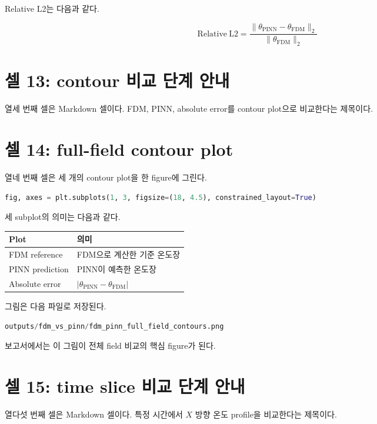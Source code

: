 \documentclass[11pt]{article}
\begin{document}
Relative L2는 다음과 같다.

\[
\mathrm{Relative\ L2}
=
\frac{\|\theta_{\mathrm{PINN}}-\theta_{\mathrm{FDM}}\|_2}
{\|\theta_{\mathrm{FDM}}\|_2}
\]

\section{셀 13: contour 비교 단계 안내}

열세 번째 셀은 Markdown 셀이다.
FDM, PINN, absolute error를 contour plot으로 비교한다는 제목이다.

\section{셀 14: full-field contour plot}

열네 번째 셀은 세 개의 contour plot을 한 figure에 그린다.

\begin{lstlisting}[language=Python]
fig, axes = plt.subplots(1, 3, figsize=(18, 4.5), constrained_layout=True)
\end{lstlisting}

세 subplot의 의미는 다음과 같다.

\begin{center}
\begin{tabular}{ll}
\toprule
Plot & 의미 \\
\midrule
FDM reference & FDM으로 계산한 기준 온도장 \\
PINN prediction & PINN이 예측한 온도장 \\
Absolute error & \(|\theta_{\mathrm{PINN}}-\theta_{\mathrm{FDM}}|\) \\
\bottomrule
\end{tabular}
\end{center}

그림은 다음 파일로 저장된다.

\begin{lstlisting}[language=Python]
outputs/fdm_vs_pinn/fdm_pinn_full_field_contours.png
\end{lstlisting}

보고서에서는 이 그림이 전체 field 비교의 핵심 figure가 된다.

\section{셀 15: time slice 비교 단계 안내}

열다섯 번째 셀은 Markdown 셀이다.
특정 시간에서 \(X\) 방향 온도 profile을 비교한다는 제목이다.
\end{document}
